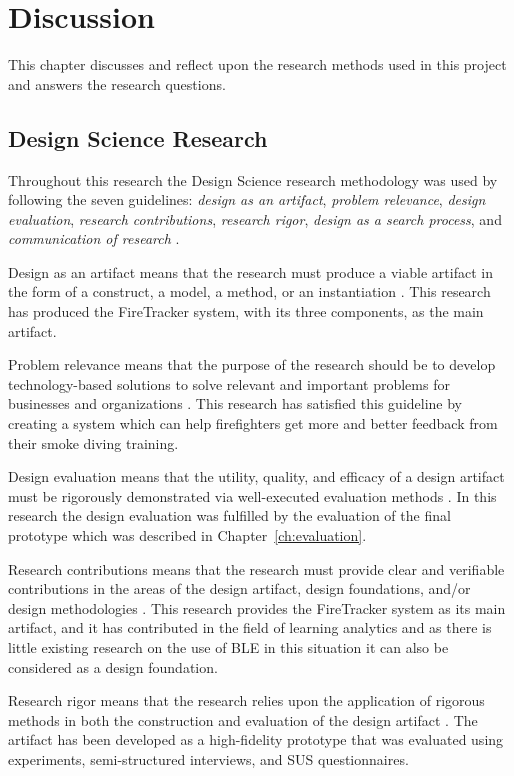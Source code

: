\documentclass[../Main/thesis.tex]{subfiles}
\begin{document}
\chapter{Discussion}
\label{ch:discussion}
This chapter discusses and reflect upon the research methods used in this project and answers the research questions.

\section{Design Science Research}
Throughout this research the Design Science research methodology was used by following the seven guidelines: \textit{design as an artifact}, \textit{problem relevance}, \textit{design evaluation}, \textit{research contributions}, \textit{research rigor}, \textit{design as a search process}, and \textit{communication of research} \citep{hevner2004design}.

Design as an artifact means that the research must produce a viable artifact in the form of a construct, a model, a method, or an instantiation \citep{hevner2004design}.
This research has produced the FireTracker system, with its three components, as the main artifact.

Problem relevance means that the purpose of the research should be to develop technology-based solutions to solve relevant and important problems for businesses and organizations \citep{hevner2004design}.
This research has satisfied this guideline by creating a system which can help firefighters get more and better feedback from their smoke diving training.

Design evaluation means that the utility, quality, and efficacy of a design artifact must be rigorously demonstrated via well-executed evaluation methods \citep{hevner2004design}.
In this research the design evaluation was fulfilled by the evaluation of the final prototype which was described in Chapter~\ref{ch:evaluation}.

Research contributions means that the research must provide clear and verifiable contributions in the areas of the design artifact, design foundations, and/or design methodologies \citep{hevner2004design}.
This research provides the FireTracker system as its main artifact, and it has contributed in the field of learning analytics and as there is little existing research on the use of BLE in this situation it can also be considered as a design foundation.

Research rigor means that the research relies upon the application of rigorous methods in both the construction and evaluation of the design artifact \citep{hevner2004design}.
The artifact has been developed as a high-fidelity prototype that was evaluated using experiments, semi-structured interviews, and SUS questionnaires.
\end{document}
